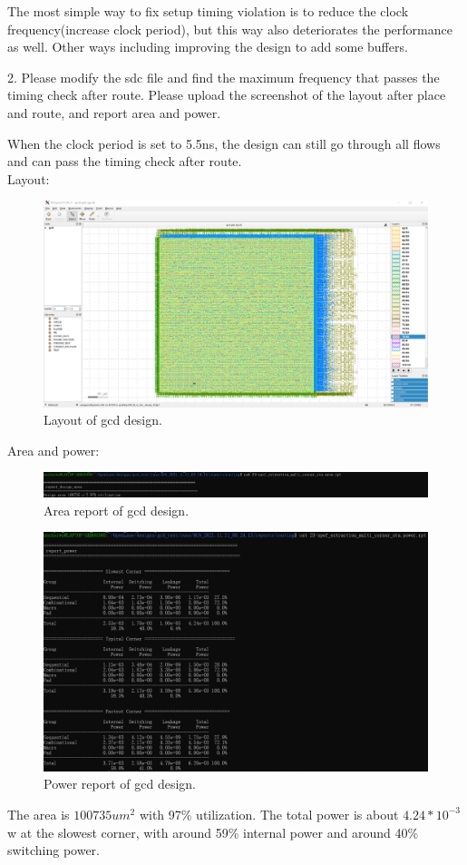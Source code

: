\documentclass[a4paper]{article}
\begin{document}
The most simple way to fix setup timing violation is to reduce the clock frequency(increase clock period), but this way also deteriorates the performance as well. Other ways including improving the design to add some buffers. 

2. Please modify the sdc file and find the maximum frequency that passes the timing check after route. Please upload the screenshot of the layout after place and route, and report area and power.

When the clock period is set to 5.5ns, the design can still go through all flows and can pass the timing check after route. \\
Layout: \\
\begin{figure}[H]
    \centering
    \includegraphics[width=1\textwidth]{exercise_1_2.png}
    \caption{Layout of gcd design.}
\end{figure}
Area and power: \\
\begin{figure}[H]
    \centering
    \includegraphics[width=1\textwidth]{exercise_1_2_2.png}
    \caption{Area report of gcd design.}
\end{figure}
\begin{figure}[H]
    \centering
    \includegraphics[width=1\textwidth]{exercise_1_2_3.png}
    \caption{Power report of gcd design.}
\end{figure}
The area is $100735um^2$ with 97\% utilization. The total power is about $4.24*10^{-3}$ w at the slowest corner, with around 59\% internal power and around 40\% switching power.
\end{document}
